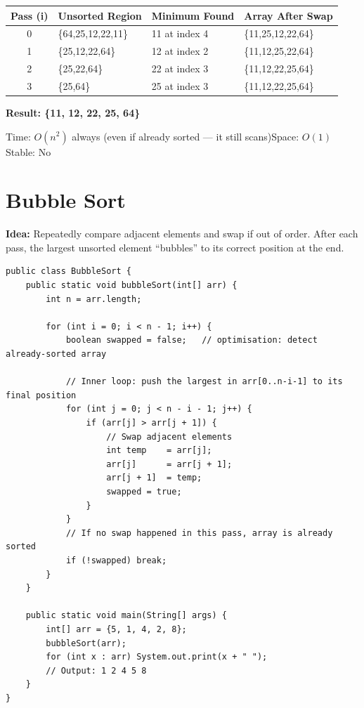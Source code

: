 \documentclass[12pt,a4paper,oneside]{book}
\begin{document}
\begin{dryrun}[Dry Run: arr = \{64, 25, 12, 22, 11\}]
\begin{center}
\begin{tabular}{clll}
\toprule
\textbf{Pass (i)} & \textbf{Unsorted Region} & \textbf{Minimum Found} & \textbf{Array After Swap}\\
\midrule
0 & \{64,25,12,22,11\} & 11 at index 4 & \{11,25,12,22,64\}\\
1 & \{25,12,22,64\}    & 12 at index 2 & \{11,12,25,22,64\}\\
2 & \{25,22,64\}       & 22 at index 3 & \{11,12,22,25,64\}\\
3 & \{25,64\}          & 25 at index 3 & \{11,12,22,25,64\}\\
\bottomrule
\end{tabular}
\end{center}
\textbf{Result: \{11, 12, 22, 25, 64\}}
\end{dryrun}

\begin{complexity}
Time: $O(n^2)$ always (even if already sorted --- it still scans)\quad Space: $O(1)$\quad Stable: No
\end{complexity}

\section{Bubble Sort}

\textbf{Idea:} Repeatedly compare adjacent elements and swap if out of order. After each pass, the largest unsorted element ``bubbles'' to its correct position at the end.

\begin{lstlisting}[caption={Bubble Sort with early-exit optimisation}]
public class BubbleSort {
    public static void bubbleSort(int[] arr) {
        int n = arr.length;

        for (int i = 0; i < n - 1; i++) {
            boolean swapped = false;   // optimisation: detect already-sorted array

            // Inner loop: push the largest in arr[0..n-i-1] to its final position
            for (int j = 0; j < n - i - 1; j++) {
                if (arr[j] > arr[j + 1]) {
                    // Swap adjacent elements
                    int temp    = arr[j];
                    arr[j]      = arr[j + 1];
                    arr[j + 1]  = temp;
                    swapped = true;
                }
            }
            // If no swap happened in this pass, array is already sorted
            if (!swapped) break;
        }
    }

    public static void main(String[] args) {
        int[] arr = {5, 1, 4, 2, 8};
        bubbleSort(arr);
        for (int x : arr) System.out.print(x + " ");
        // Output: 1 2 4 5 8
    }
}
\end{lstlisting}
\end{document}
